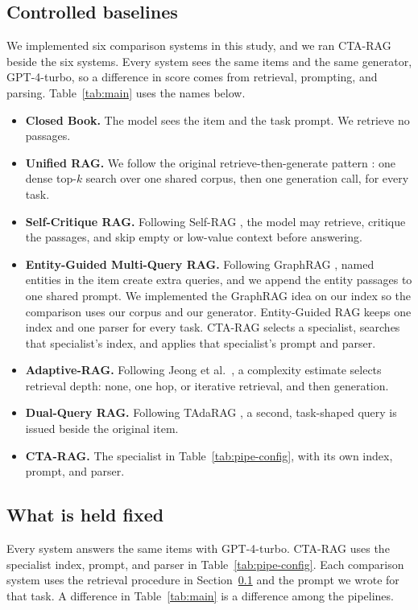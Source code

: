 \documentclass[5p,times,authoryear]{elsarticle}
\begin{document}
\subsection{Controlled baselines}\label{sec:baselines}
We implemented six comparison systems in this study, and we ran CTA-RAG beside the six systems. Every system sees the same items and the same generator, GPT-4-turbo, so a difference in score comes from retrieval, prompting, and parsing. Table~\ref{tab:main} uses the names below.

\begin{itemize}[leftmargin=*,nosep,topsep=2pt]
\item \textbf{Closed Book.} The model sees the item and the task prompt. We retrieve no passages.
\item \textbf{Unified RAG.} We follow the original retrieve-then-generate pattern \citep{lewis2020rag}: one dense top-$k$ search over one shared corpus, then one generation call, for every task.
\item \textbf{Self-Critique RAG.} Following Self-RAG \citep{asai2023selfrag}, the model may retrieve, critique the passages, and skip empty or low-value context before answering.
\item \textbf{Entity-Guided Multi-Query RAG.} Following GraphRAG \citep{edge2024graphrag}, named entities in the item create extra queries, and we append the entity passages to one shared prompt. We implemented the GraphRAG idea on our index so the comparison uses our corpus and our generator. Entity-Guided RAG keeps one index and one parser for every task. CTA-RAG selects a specialist, searches that specialist's index, and applies that specialist's prompt and parser.
\item \textbf{Adaptive-RAG.} Following Jeong et al.\ \citep{jeong2024adaptive}, a complexity estimate selects retrieval depth: none, one hop, or iterative retrieval, and then generation.
\item \textbf{Dual-Query RAG.} Following TAdaRAG \citep{zhang2026tadarag}, a second, task-shaped query is issued beside the original item.
\item \textbf{CTA-RAG.} The specialist in Table~\ref{tab:pipe-config}, with its own index, prompt, and parser.
\end{itemize}

\subsection{What is held fixed}\label{sec:integrity}
Every system answers the same items with GPT-4-turbo. CTA-RAG uses the specialist index, prompt, and parser in Table~\ref{tab:pipe-config}. Each comparison system uses the retrieval procedure in Section~\ref{sec:baselines} and the prompt we wrote for that task. A difference in Table~\ref{tab:main} is a difference among the pipelines.
\end{document}
